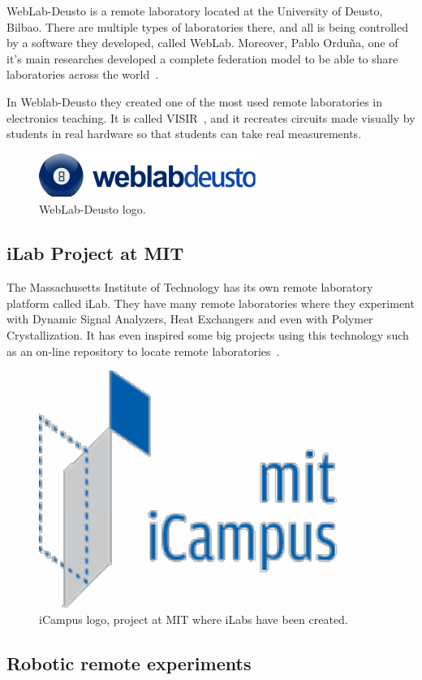 WebLab-Deusto is a remote laboratory located at the University of Deusto, Bilbao. There are multiple
types of laboratories there, and all is being controlled by a software they developed, called
WebLab. Moreover, Pablo Orduña, one of it's main researches developed a complete federation model
to be able to share laboratories across the world~\cite{porduna_phd}.


In Weblab-Deusto they created one of the most used remote laboratories in electronics teaching. It
is called VISIR~\cite{visir}, and it recreates circuits made visually by students in real hardware
so that students can take real measurements.

\begin{figure}[!htbp]
	\centering
	\includegraphics[width=.4\textwidth]{fig/weblab}
	\caption{WebLab-Deusto logo.}
\end{figure}

\subsection{iLab Project at MIT}

The Massachusetts Institute of Technology has its own remote laboratory platform called iLab. They
have many remote laboratories where they experiment with Dynamic Signal Analyzers, Heat Exchangers
and even with Polymer Crystallization. It has even inspired some big projects using this technology
such as an on-line repository to locate remote laboratories~\cite{ilabs_multi}.

\begin{figure}[!htbp]
	\centering
	\includegraphics[width=.4\textwidth]{fig/icampus}
	\caption{iCampus logo, project at MIT where iLabs have been created.}
\end{figure}

\subsection{Robotic remote experiments}

